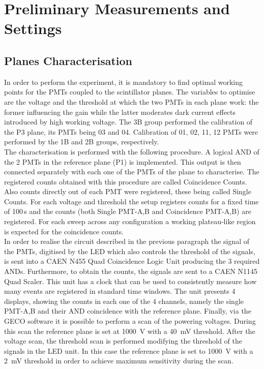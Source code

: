 \documentclass[../main.tex]{subfiles}
\begin{document}
\section{Preliminary Measurements and Settings}

\subsection{Planes Characterisation}
\label{subsec:planecalibration}
\noindent In order to perform the experiment, it is mandatory to find optimal working points for the PMTs coupled to the scintillator planes. The variables to optimise are the voltage and the threshold at which the two PMTs in each plane work: the former influencing the gain while the latter moderates dark current effects introduced by high working voltage. The 3B group performed the calibration of the P3 plane, its PMTs being 03 and 04. Calibration of 01, 02, 11, 12 PMTs were performed by the 1B and 2B groups, respectively.\\

The characterisation is performed with the following procedure. A logical AND of the 2 PMTs in the reference plane (P1) is implemented. This output is then connected separately with each one of the PMTs of the plane to characterise. The registered counts obtained with this procedure are called Coincidence Counts. Also counts directly out of each PMT were registered, these being called Single Counts. For each voltage and threshold the setup registers counts for a fixed time of 100\,s and the counts (both Single PMT-A,B and Coincidence PMT-A,B) are registered. For each sweep across any configuration a working plateau-like region is expected for the coincidence counts.\\

In order to realise the circuit described in the previous paragraph the signal of the PMTs, digitised by the LED which also controls the threshold of the signals, is sent into a CAEN N455 Quad Coincidence Logic Unit producing the 3 required ANDs. Furthermore, to obtain the counts, the signals are sent to a CAEN N1145 Quad Scaler. This unit has a clock that can be used to consistently measure how many events are registered in standard time windows. The unit presents 4 displays, showing the counts in each one of the 4 channels, namely the single PMT-A,B and their AND coincidence with the reference plane. Finally, via the GECO software it is possible to perform a scan of the powering voltages. During this scan the reference plane is set at \SI{1000}{\volt} with a \SI{40}{\milli \volt} threshold. After the voltage scan, the threshold scan is performed modifying the threshold of the signals in the LED unit. In this case the reference plane is set to \SI{1000}{\volt} with a \SI{2}{\milli \volt} threshold in order to achieve maximum sensitivity during the scan.\\
\end{document}

